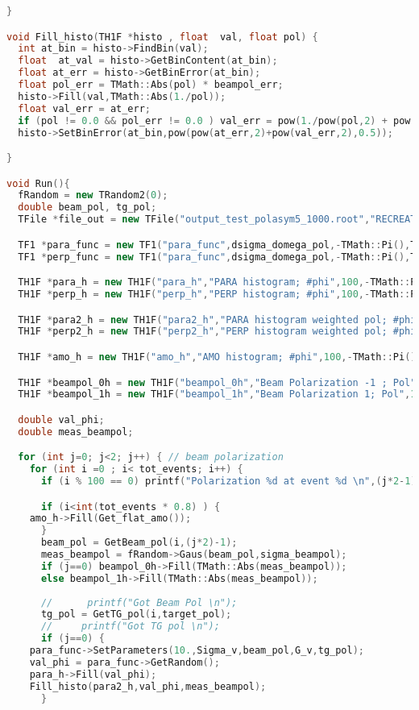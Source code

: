 \begin{lstlisting}[language=C++]
}

void Fill_histo(TH1F *histo , float  val, float pol) {
  int at_bin = histo->FindBin(val);
  float  at_val = histo->GetBinContent(at_bin);
  float at_err = histo->GetBinError(at_bin);
  float pol_err = TMath::Abs(pol) * beampol_err;
  histo->Fill(val,TMath::Abs(1./pol));
  float val_err = at_err;
  if (pol != 0.0 && pol_err != 0.0 ) val_err = pow(1./pow(pol,2) + pow(pol_err,2)/pow(pol,4),0.5);
  histo->SetBinError(at_bin,pow(pow(at_err,2)+pow(val_err,2),0.5));

}

void Run(){
  fRandom = new TRandom2(0);
  double beam_pol, tg_pol;
  TFile *file_out = new TFile("output_test_polasym5_1000.root","RECREATE");

  TF1 *para_func = new TF1("para_func",dsigma_domega_pol,-TMath::Pi(),TMath::Pi(),5);
  TF1 *perp_func = new TF1("para_func",dsigma_domega_pol,-TMath::Pi(),TMath::Pi(),5);

  TH1F *para_h = new TH1F("para_h","PARA histogram; #phi",100,-TMath::Pi(),TMath::Pi());
  TH1F *perp_h = new TH1F("perp_h","PERP histogram; #phi",100,-TMath::Pi(),TMath::Pi());

  TH1F *para2_h = new TH1F("para2_h","PARA histogram weighted pol; #phi",100,-TMath::Pi(),TMath::Pi());
  TH1F *perp2_h = new TH1F("perp2_h","PERP histogram weighted pol; #phi",100,-TMath::Pi(),TMath::Pi());

  TH1F *amo_h = new TH1F("amo_h","AMO histogram; #phi",100,-TMath::Pi(),TMath::Pi());

  TH1F *beampol_0h = new TH1F("beampol_0h","Beam Polarization -1 ; Pol",100,0.,1.0);
  TH1F *beampol_1h = new TH1F("beampol_1h","Beam Polarization 1; Pol",100,0.,1.0);

  double val_phi;
  double meas_beampol;

  for (int j=0; j<2; j++) { // beam polarization
    for (int i =0 ; i< tot_events; i++) {
      if (i % 100 == 0) printf("Polarization %d at event %d \n",(j*2-1),i);

      if (i<int(tot_events * 0.8) ) {
	amo_h->Fill(Get_flat_amo());
      }
      beam_pol = GetBeam_pol(i,(j*2)-1);
      meas_beampol = fRandom->Gaus(beam_pol,sigma_beampol);
      if (j==0) beampol_0h->Fill(TMath::Abs(meas_beampol));
      else beampol_1h->Fill(TMath::Abs(meas_beampol));
   
      //      printf("Got Beam Pol \n");
      tg_pol = GetTG_pol(i,target_pol);
      //     printf("Got TG pol \n");
      if (j==0) {
	para_func->SetParameters(10.,Sigma_v,beam_pol,G_v,tg_pol);
	val_phi = para_func->GetRandom();
	para_h->Fill(val_phi);
	Fill_histo(para2_h,val_phi,meas_beampol);
      }


\end{lstlisting}
